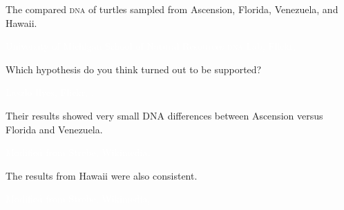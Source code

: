 \documentclass[t]{beamer}
\begin{document}
{
\begin{frame}[b]{The  compared \textsc{dna} of turtles sampled from Ascension, Florida, Venezuela, and Hawaii.}

\tiny\textcolor{white}{University of Michigan School of Natural Resources \textsc{dna} Lab, Flickr, }
\end{frame}
}
%
{
\begin{frame}[b,plain]{Which hypothesis do you think turned out to be supported?}

\hfill\tiny\textcolor{white}{Laszlo Ilyes, Flickr, .}
\end{frame}
}
%
{
\begin{frame}[b]{Their results showed very small DNA differences between Ascension versus Florida and Venezuela.}
	
\hfill\tiny\textcolor{white}{Modified from Strebe, Wikimedia, }
\end{frame}
}
%
{
\begin{frame}[b]{The results from Hawaii were also consistent.}
	
\hfill\tiny\textcolor{white}{Modified from Strebe, Wikimedia, }
\end{frame}
}
%
\end{document}
